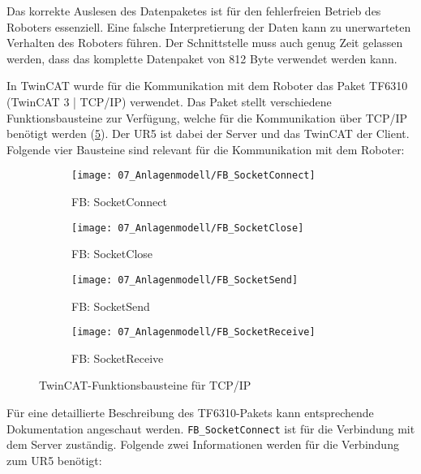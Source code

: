 		Das korrekte Auslesen des Datenpaketes ist für den fehlerfreien Betrieb des Roboters essenziell. Eine falsche Interpretierung der Daten kann zu unerwarteten Verhalten des Roboters führen. Der Schnittstelle muss auch genug Zeit gelassen werden, dass das komplette Datenpaket von 812 Byte verwendet werden kann.
		
		\newpage
		
		In TwinCAT wurde für die Kommunikation mit dem Roboter das Paket TF6310 (TwinCAT 3 | TCP/IP) verwendet. Das Paket stellt verschiedene Funktionsbausteine zur Verfügung, welche für die Kommunikation über TCP/IP benötigt werden (\ref{fig:TwinCAT-Funktionsbausteine}). Der UR5 ist dabei der Server und das TwinCAT der Client. Folgende vier Bausteine sind relevant für die Kommunikation mit dem Roboter:
		
		\begin{figure}[h!]
			\centering
			\begin{subfigure}[b]{0.45\textwidth}
				\centering
				\texttt{[image: 07\_Anlagenmodell/FB\_SocketConnect]}
				\caption{FB: SocketConnect}
				\label{fig:FB_SocketConnect}
			\end{subfigure}
			\hfill
			\begin{subfigure}[b]{0.45\textwidth}
				\centering
				\texttt{[image: 07\_Anlagenmodell/FB\_SocketClose]}
				\caption{FB: SocketClose}
				\label{fig:FB_SocketClose}
			\end{subfigure}
			\vfill
			\begin{subfigure}[b]{0.45\textwidth}
				\centering
				\texttt{[image: 07\_Anlagenmodell/FB\_SocketSend]}
				\caption{FB: SocketSend}
				\label{fig:FB_SocketSend}
			\end{subfigure}
			\hfill
			\begin{subfigure}[b]{0.45\textwidth}
				\centering
				\texttt{[image: 07\_Anlagenmodell/FB\_SocketReceive]}
				\caption{FB: SocketReceive}
				\label{fig:FB_SocketReceive}
			\end{subfigure}
			\caption{TwinCAT-Funktionsbausteine für TCP/IP}
			\label{fig:TwinCAT-Funktionsbausteine}
		\end{figure}
		
		Für eine detaillierte Beschreibung des TF6310-Pakets kann entsprechende Dokumentation angeschaut werden. 
		\verb|FB_SocketConnect| ist für die Verbindung mit dem Server zuständig. Folgende zwei Informationen werden für die Verbindung zum UR5 benötigt: 
		
